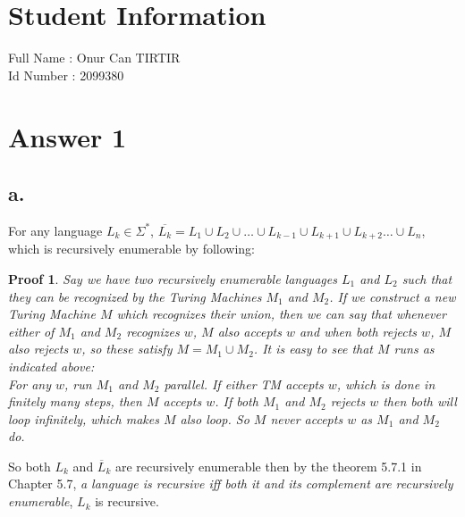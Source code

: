 \documentclass[12pt]{article}
\newtheorem{thm}{Proof}
\begin{document}
%    

\section*{Student Information} 
Full Name :  Onur Can TIRTIR\\
Id Number :  2099380\\

\section*{Answer 1}

\subsection*{a.}

For any language $L_k \in \Sigma^*$, $\overline{L_k} = L_1 \cup L_2 \cup \dots \cup L_{k-1
} \cup L_{k+1} \cup L_{k+2} \dots \cup L_{n}$, which is recursively enumerable by
following:

    \begin{thm}
    Say we have two recursively enumerable languages $L_1$ and $L_2$ such that they can 
be recognized by the Turing Machines $M_1$ and $M_2$. If we construct a new Turing Machine
 $M$ which recognizes their union, then we can say that whenever either of $M_1$ and $M_2$
 recognizes $w$, $M$ also accepts $w$ and when both rejects $w$, $M$ also rejects $w$, 
so these satisfy $M = M_1 \cup M_2$. It is easy to see that $M$ runs as indicated above:\\
    For any $w$, run $M_1$ and $M_2$ parallel. If either TM accepts $w$, which is done in
finitely many steps, then $M$ accepts $w$. If both $M_1$ and $M_2$ rejects $w$ then both 
will loop infinitely, which makes $M$ also loop. So $M$ never accepts $w$ as $M_1$ and 
$M_2$ do.
    \end{thm}

So both $L_k$ and $\overline L_k$ are recursively enumerable then by the theorem 5.7.1 
in Chapter 5.7, \textit{a language is recursive iff both it and its complement are 
recursively enumerable}, $L_k$ is recursive.
\end{document}
